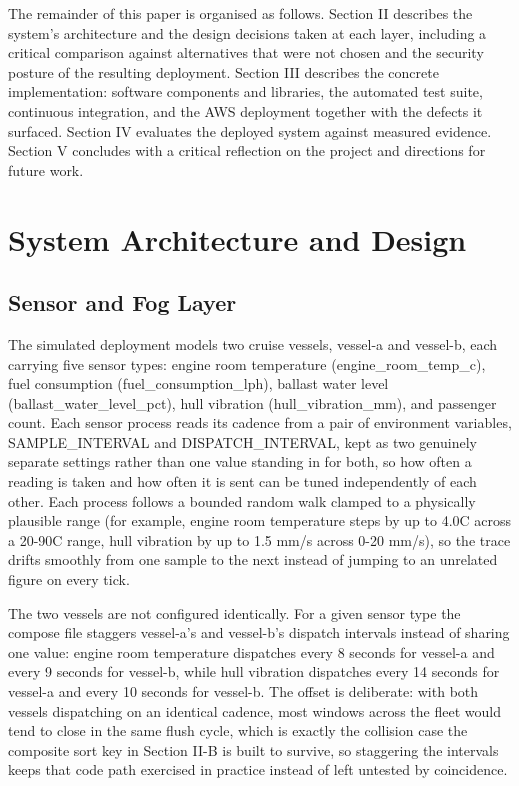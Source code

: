 \documentclass[conference]{IEEEtran}
\begin{document}
The remainder of this paper is organised as follows. Section II describes the system's architecture and the design decisions taken at each layer, including a critical comparison against alternatives that were not chosen and the security posture of the resulting deployment. Section III describes the concrete implementation: software components and libraries, the automated test suite, continuous integration, and the AWS deployment together with the defects it surfaced. Section IV evaluates the deployed system against measured evidence. Section V concludes with a critical reflection on the project and directions for future work.

\section{System Architecture and Design}

\subsection{Sensor and Fog Layer}
The simulated deployment models two cruise vessels, vessel-a and vessel-b, each carrying five sensor types: engine room temperature (engine\_room\_temp\_c), fuel consumption (fuel\_consumption\_lph), ballast water level (ballast\_water\_level\_pct), hull vibration (hull\_vibration\_mm), and passenger count. Each sensor process reads its cadence from a pair of environment variables, SAMPLE\_INTERVAL and DISPATCH\_INTERVAL, kept as two genuinely separate settings rather than one value standing in for both, so how often a reading is taken and how often it is sent can be tuned independently of each other. Each process follows a bounded random walk clamped to a physically plausible range (for example, engine room temperature steps by up to 4.0\textdegree{}C across a 20-90\textdegree{}C range, hull vibration by up to 1.5 mm/s across 0-20 mm/s), so the trace drifts smoothly from one sample to the next instead of jumping to an unrelated figure on every tick.

The two vessels are not configured identically. For a given sensor type the compose file staggers vessel-a's and vessel-b's dispatch intervals instead of sharing one value: engine room temperature dispatches every 8 seconds for vessel-a and every 9 seconds for vessel-b, while hull vibration dispatches every 14 seconds for vessel-a and every 10 seconds for vessel-b. The offset is deliberate: with both vessels dispatching on an identical cadence, most windows across the fleet would tend to close in the same flush cycle, which is exactly the collision case the composite sort key in Section II-B is built to survive, so staggering the intervals keeps that code path exercised in practice instead of left untested by coincidence.
\end{document}
